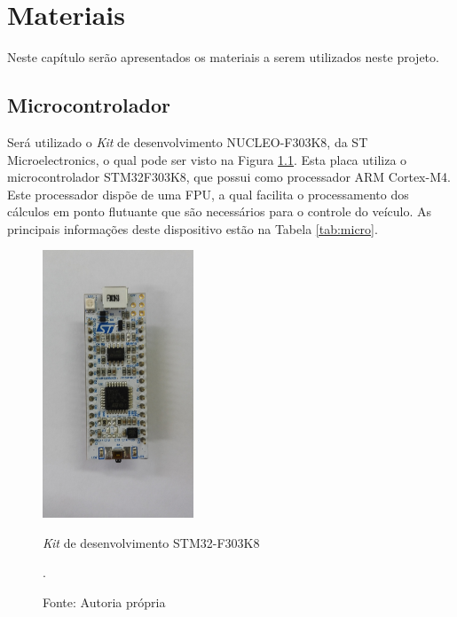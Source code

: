 

\chapter{Materiais} \label{cap:materiais}
\vspace{-2cm}
Neste capítulo serão apresentados os materiais a serem utilizados neste projeto.\newline

\section{Microcontrolador} \label{cap:micro}

Será utilizado o \textit{Kit} de desenvolvimento NUCLEO-F303K8, da ST Microelectronics, %
o qual pode ser visto na Figura \ref{fig:nucleo}. Esta placa utiliza o microcontrolador STM32F303K8, que possui como processador 
ARM Cortex-M4. Este processador dispõe de uma FPU, a qual facilita o processamento dos cálculos em ponto flutuante que são 
necessários para o controle do veículo. As principais informações deste dispositivo estão na Tabela \ref{tab:micro}.

\begin{figure}[h!]
 \centering
 \captionsetup{width=0.4\textwidth,font=footnotesize,textfont=bf}
 \includegraphics[width=0.4\textwidth,height=0.8\textheight,keepaspectratio]{figuras/nucleo.jpg}
 \caption{\textit{Kit} de desenvolvimento STM32-F303K8 \label{fig:nucleo}}
 \vspace{-0.3cm}
 \caption*{Fonte: Autoria própria}.
\end{figure}


